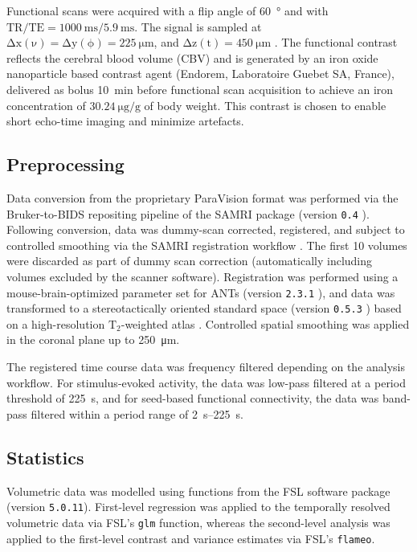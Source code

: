 Functional scans were acquired with a flip angle of \SI{60}{\degree} and with $\mathrm{TR/TE = \SI{1000}{\milli\second}/\SI{5.9}{\milli\second}}$.
The signal is sampled at $\mathrm{\Delta x(\nu)=\Delta y(\phi)=\SI{225}{\micro\meter}}$, and $\mathrm{\Delta z(t)=\SI{450}{\micro\meter}}$ .
The functional contrast reflects the cerebral blood volume (CBV) and is generated by an iron oxide nanoparticle based contrast agent (Endorem, Laboratoire Guebet SA, France), delivered as bolus \SI{10}{\minute} before functional scan acquisition to achieve an iron concentration of $\SI{30.24}{\micro\gram\per\gram}$ of body weight.
This contrast is chosen to enable short echo-time imaging and minimize artefacts.

\subsection{Preprocessing}

Data conversion from the proprietary ParaVision format was performed via the Bruker-to-BIDS repositing pipeline \cite{aowsis} of the SAMRI package (version \textcolor{mg}{\texttt{0.4}} \cite{samri}).
Following conversion, data was dummy-scan corrected, registered, and subject to controlled smoothing via the SAMRI registration workflow \cite{irsabi}.
The first 10 volumes were discarded as part of dummy scan correction (automatically including volumes excluded by the scanner software).
Registration was performed using a mouse-brain-optimized parameter set for ANTs (version \textcolor{mg}{\texttt{2.3.1}} \cite{ants}), and data was transformed to a stereotactically oriented standard space (version \textcolor{mg}{\texttt{0.5.3}} \cite{atlases_generator}) based on a high-resolution $\mathrm{T_2}$-weighted atlas \cite{dsu}.
Controlled spatial smoothing was applied in the coronal plane up to \SI{250}{\micro\meter}.

The registered time course data was frequency filtered depending on the analysis workflow.
For stimulus-evoked activity, the data was low-pass filtered at a period threshold of \SI{225}{\second}, and for seed-based functional connectivity, the data was band-pass filtered within a period range of \SIrange{2}{225}{\second}.

\subsection{Statistics}
Volumetric data was modelled using functions from the FSL software package (version \textcolor{mg}{\texttt{5.0.11}}).
First-level regression was applied to the temporally resolved volumetric data via FSL's \textcolor{mg}{\texttt{glm}} function, whereas the second-level analysis was applied to the first-level contrast and variance estimates via FSL's \textcolor{mg}{\texttt{flameo}}.

